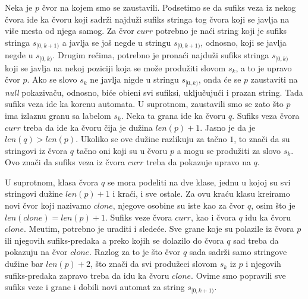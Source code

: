Neka je $p$ \v cvor na kojem smo se zaustavili. Podsetimo se da sufiks veza iz nekog \v cvora ide ka \v cvoru koji sadr\v zi najdu\v zi sufiks stringa tog \v cvora koji se javlja na vi\v se mesta od njega samog. Za \v cvor $curr$ potrebno je na\' ci string koji je sufiks stringa $s_{[0,k+1)}$ a javlja se jo\v s negde u stringu $s_{[0,k+1)}$, odnosno, koji se javlja negde u $s_{[0,k)}$. Drugim re\v cima, potrebno je prona\' ci najdu\v zi sufiks stringa $s_{[0,k)}$ koji se javlja na nekoj poziciji koja se mo\v ze produ\v ziti slovom $s_k$, a to je upravo \v cvor $p$. Ako se slovo $s_k$ ne javlja nigde u stringu $s_{[0,k)}$, onda \' ce se $p$ zaustaviti na \textit{null} pokaziva\v cu, odnosno, bi\' ce obi\dj eni svi sufiksi, uklju\v cuju\' ci i prazan string.  Tada sufiks veza ide ka korenu automata. U suprotnom, zaustavili smo se zato \v sto $p$ ima izlaznu granu sa labelom $s_k$. Neka ta grana ide ka \v cvoru $q$. Sufiks veza \v cvora $curr$ treba da ide ka \v cvoru \v cija je du\v zina $len(p)+1$. Jasno je da je $len(q) > len(p)$. Ukoliko se ove du\v zine razlikuju za ta\v cno $1$, to zna\v ci da su stringovi iz \v cvora $q$ ta\v cno oni koji su u \v cvoru $p$ a mogu se produ\v ziti za slovo $s_k$. Ovo zna\v ci da sufiks veza iz \v cvora $curr$ treba da pokazuje upravo na $q$.

U suprotnom, klasa \v cvora $q$ se mora podeliti na dve klase, jednu u kojoj su svi stringovi du\v zine $len(p)+1$ i kra\' ci, i sve ostale. Za ovu kra\' cu klasu kreiramo novi \v cvor koji nazivamo $clone$, njegove osobine su iste kao za \v cvor $q$, osim \v sto je $len(clone) = len(p)+1$. Sufiks veze \v cvora $curr$, kao i \v cvora $q$ idu ka \v cvoru $clone$. Me\dj utim, potrebno je uraditi i slede\' ce. Sve grane koje su polazile iz \v cvora $p$ ili njegovih sufiks-predaka a preko kojih se dolazilo do \v cvora $q$ sad treba da pokazuju na \v cvor $clone$. Razlog za to je \v sto \v cvor $q$ sada sadr\v zi samo stringove du\v zine bar $len(p) + 2$, \v sto zna\v ci da svi produ\v zeci slovom $s_k$ iz $p$ i njegovih sufiks-predaka zapravo treba da idu ka \v cvoru $clone$. Ovime smo popravili sve sufiks veze i grane i dobili novi automat za string $s_{[0, k+1)}$.

\noindent
\begin{minipage}[l]{\textwidth}

\end{minipage}

\noindent
\begin{minipage}[l]{\textwidth}

\end{minipage}

